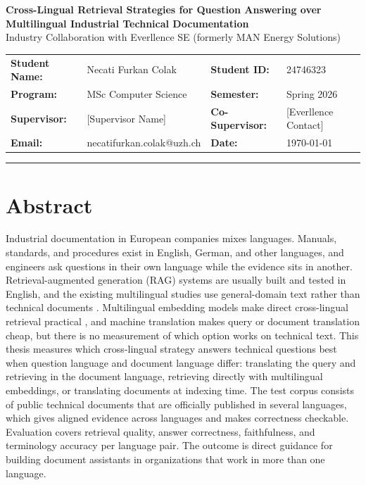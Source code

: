 \documentclass[10pt,a4paper]{article}
\begin{document}
\begin{center}
    {\Large \textbf{Cross-Lingual Retrieval Strategies for Question Answering over\\[0.15em]Multilingual Industrial Technical Documentation}}\\[0.3em]
    {\normalsize Industry Collaboration with Everllence SE (formerly MAN Energy Solutions)}
\end{center}

\vspace{0.35em}

\noindent
\begin{tabularx}{\textwidth}{>{\bfseries}l X >{\bfseries}l X}
Student Name: & Necati Furkan Colak       & Student ID:    & 24746323 \\
Program:      & MSc Computer Science      & Semester:      & Spring 2026 \\
Supervisor:   & [Supervisor Name]         & Co-Supervisor: & [Everllence Contact] \\
Email:        & necatifurkan.colak@uzh.ch & Date:          & \today \\
\end{tabularx}

\vspace{0.5em}
\hrule
\vspace{0.5em}

\section{Abstract}

Industrial documentation in European companies mixes languages. Manuals, standards, and procedures exist in English, German, and other languages, and engineers ask questions in their own language while the evidence sits in another. Retrieval-augmented generation (RAG) systems are usually built and tested in English, and the existing multilingual studies use general-domain text rather than technical documents \cite{chirkova2024}. Multilingual embedding models make direct cross-lingual retrieval practical \cite{wang2024}, and machine translation makes query or document translation cheap, but there is no measurement of which option works on technical text. This thesis measures which cross-lingual strategy answers technical questions best when question language and document language differ: translating the query and retrieving in the document language, retrieving directly with multilingual embeddings, or translating documents at indexing time. The test corpus consists of public technical documents that are officially published in several languages, which gives aligned evidence across languages and makes correctness checkable. Evaluation covers retrieval quality, answer correctness, faithfulness, and terminology accuracy per language pair. The outcome is direct guidance for building document assistants in organizations that work in more than one language.
\end{document}
